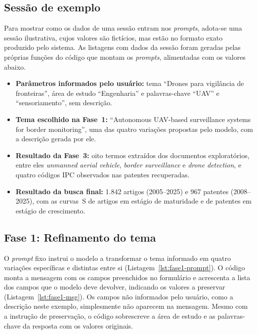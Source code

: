 \documentclass[12pt, a4paper]{article}
\begin{document}
  \subsection{Sessão de exemplo}

  Para mostrar como os dados de uma sessão entram nos \textit{prompts},
adota-se uma sessão ilustrativa, cujos valores são fictícios, mas estão no
formato exato produzido pelo sistema. As listagens com dados da sessão foram
geradas pelas próprias funções do código que montam os \textit{prompts},
alimentadas com os valores abaixo.

  \begin{itemize}
    \item \textbf{Parâmetros informados pelo usuário:} tema ``Drones para
    vigilância de fronteiras'', área de estudo ``Engenharia'' e
    palavras-chave ``UAV'' e ``sensoriamento'', sem descrição.

    \item \textbf{Tema escolhido na Fase~1:} ``Autonomous UAV-based
    surveillance systems for border monitoring'', uma das quatro variações
    propostas pelo modelo, com a descrição gerada por ele.

    \item \textbf{Resultado da Fase~3:} oito termos extraídos dos documentos
    exploratórios, entre eles \textit{unmanned aerial vehicle},
    \textit{border surveillance} e \textit{drone detection}, e quatro códigos
    IPC observados nas patentes recuperadas.

    \item \textbf{Resultado da busca final:} 1.842 artigos (2005--2025) e 967
    patentes (2008--2025), com as curvas~S de artigos em estágio de
    maturidade e de patentes em estágio de crescimento.
  \end{itemize}

  \subsection{Fase 1: Refinamento do tema}

  O \textit{prompt} fixo instrui o modelo a transformar o tema informado em
quatro variações específicas e distintas entre si
(Listagem~\ref{lst:fase1-prompt}). O código monta a mensagem com os campos
preenchidos no formulário e acrescenta a lista dos campos que o modelo deve
devolver, indicando os valores a preservar
(Listagem~\ref{lst:fase1-msg}). Os campos não informados pelo usuário, como
a descrição neste exemplo, simplesmente não aparecem na mensagem. Mesmo com a
instrução de preservação, o código sobrescreve a área de estudo e as
palavras-chave da resposta com os valores originais.
\end{document}
